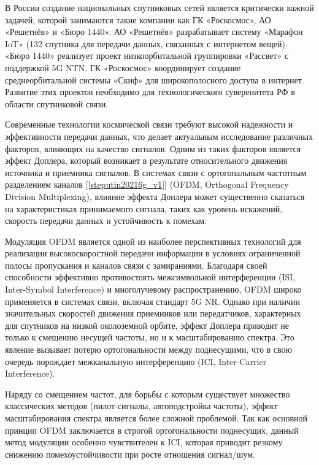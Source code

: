 В России создание национальных спутниковых сетей является критически важной задачей, которой
занимаются такие компании как ГК «Роскосмос»,
АО «Решетнёв» и «Бюро 1440». АО «Решетнёв» разрабатывает систему «Марафон IoT»
(132 спутника для передачи данных, связанных с интернетом вещей).
«Бюро 1440» реализует проект низкоорбитальной группировки «Рассвет» с поддержкой 5G NTN.
ГК «Роскосмос» координирует создание среднеорбитальной системы «Скиф» для широкополосного доступа в интернет.
Развитие этих проектов необходимо для технологического суверенитета РФ в области спутниковой связи.

Современные технологии космической связи требуют высокой надежности и эффективности передачи данных,
что делает актуальным исследование различных факторов, влияющих на качество сигналов.
Одним из таких факторов является эффект Доплера, который возникает в результате относительного
движения источника и приемника сигналов. В системах связи с ортогональным частотным разделением каналов [\ref{steputin20216g_v1}]
(OFDM, Orthogonal Frequency Division Multiplexing), влияние эффекта Доплера может существенно сказаться
на характеристиках принимаемого сигнала, таких как уровень искажений, скорость передачи данных и устойчивость к помехам.

Модуляция OFDM является одной из наиболее перспективных технологий для реализации высокоскоростной передачи
информации в условиях ограниченной полосы пропускания и каналов связи с замираниями.
Благодаря своей способности эффективно противостоять межсимвольной интерференции (ISI, Inter-Symbol Interference)
и многолучевому распространению, OFDM широко применяется в системах связи, включая стандарт 5G NR.
Однако при наличии значительных скоростей движения приемников или передатчиков,
характерных для спутников на низкой околоземной орбите,
эффект Доплера приводит не только к смещению несущей частоты,
но и к масштабированию спектра. Это явление вызывает потерю ортогональности между поднесущими,
что в свою очередь порождает межканальную интерференцию (ICI, Inter-Carrier Interference).

Наряду со смещением частот, для борьбы с которым существует множество классических методов
(пилот-сигналы, автоподстройка частоты), эффект масштабирования спектра является более сложной проблемой.
Так как основной принцип OFDM заключается в строгой ортогональности поднесущих, данный метод модуляции 
особенно чувствителен к ICI, которая приводит резкому снижению помехоустойчивости при росте отношения сигнал/шум.

